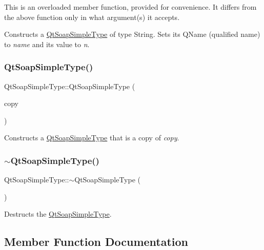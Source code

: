 This is an overloaded member function, provided for convenience. It differs from the above function only in what argument(s) it accepts.

Constructs a \mbox{\hyperlink{class_qt_soap_simple_type}{Qt\+Soap\+Simple\+Type}} of type String. Sets its Q\+Name (qualified name) to {\itshape name} and its value to {\itshape n}. \mbox{\label{class_qt_soap_simple_type_a287b8d2032e92c1d8a3d6a916097e10f}} 
\subsubsection{\texorpdfstring{Qt\+Soap\+Simple\+Type()}{QtSoapSimpleType()}\hspace{0.1cm}{\footnotesize\ttfamily [6/6]}}
{\footnotesize\ttfamily Qt\+Soap\+Simple\+Type\+::\+Qt\+Soap\+Simple\+Type (\begin{DoxyParamCaption}\item[{const \mbox{\hyperlink{class_qt_soap_simple_type}{Qt\+Soap\+Simple\+Type}} \&}]{copy }\end{DoxyParamCaption})}

Constructs a \mbox{\hyperlink{class_qt_soap_simple_type}{Qt\+Soap\+Simple\+Type}} that is a copy of {\itshape copy}. \mbox{\label{class_qt_soap_simple_type_a2f515e12dd8cf786976df43a4d0de067}} 
\subsubsection{\texorpdfstring{$\sim$\+Qt\+Soap\+Simple\+Type()}{~QtSoapSimpleType()}}
{\footnotesize\ttfamily Qt\+Soap\+Simple\+Type\+::$\sim$\+Qt\+Soap\+Simple\+Type (\begin{DoxyParamCaption}{ }\end{DoxyParamCaption})}

Destructs the \mbox{\hyperlink{class_qt_soap_simple_type}{Qt\+Soap\+Simple\+Type}}. 

\subsection{Member Function Documentation}
\mbox{\label{class_qt_soap_simple_type_a046134cfc66fd8c72f6d80203d22b0c2}} 
